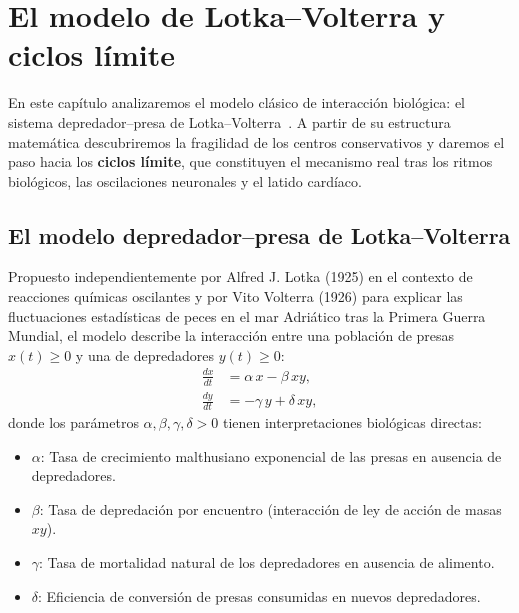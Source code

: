 \section{El modelo de Lotka--Volterra y ciclos límite}

En este capítulo analizaremos el modelo clásico de interacción biológica: el sistema depredador--presa de Lotka--Volterra~\cite{volterra1926,murray2002}. A partir de su estructura matemática descubriremos la fragilidad de los centros conservativos y daremos el paso hacia los \textbf{ciclos límite}, que constituyen el mecanismo real tras los ritmos biológicos, las oscilaciones neuronales y el latido cardíaco.

\subsection{El modelo depredador--presa de Lotka--Volterra}

Propuesto independientemente por Alfred J. Lotka (1925) en el contexto de reacciones químicas oscilantes y por Vito Volterra (1926) para explicar las fluctuaciones estadísticas de peces en el mar Adriático tras la Primera Guerra Mundial, el modelo describe la interacción entre una población de presas $x(t) \ge 0$ y una de depredadores $y(t) \ge 0$:
\begin{align}
  \frac{dx}{dt} &= \alpha\, x - \beta\, x y, \label{eq:lv-x}\\[2pt]
  \frac{dy}{dt} &= -\gamma\, y + \delta\, x y, \label{eq:lv-y}
\end{align}
donde los parámetros $\alpha, \beta, \gamma, \delta > 0$ tienen interpretaciones biológicas directas:
\begin{itemize}
    \item $\alpha$: Tasa de crecimiento malthusiano exponencial de las presas en ausencia de depredadores.
    \item $\beta$: Tasa de depredación por encuentro (interacción de ley de acción de masas $xy$).
    \item $\gamma$: Tasa de mortalidad natural de los depredadores en ausencia de alimento.
    \item $\delta$: Eficiencia de conversión de presas consumidas en nuevos depredadores.
\end{itemize}


